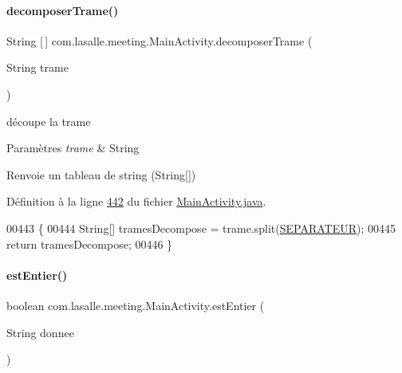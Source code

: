 \paragraph{\texorpdfstring{decomposer\+Trame()}{decomposerTrame()}}
{\footnotesize\ttfamily String \mbox{[}$\,$\mbox{]} com.\+lasalle.\+meeting.\+Main\+Activity.\+decomposer\+Trame (\begin{DoxyParamCaption}\item[{String}]{trame }\end{DoxyParamCaption})}



découpe la trame 


\begin{DoxyParams}{Paramètres}
{\em trame} & String \\
\hline
\end{DoxyParams}
\begin{DoxyReturn}{Renvoie}
un tableau de string (String\mbox{[}\mbox{]}) 
\end{DoxyReturn}


Définition à la ligne \hyperlink{_main_activity_8java_source_l00442}{442} du fichier \hyperlink{_main_activity_8java_source}{Main\+Activity.\+java}.


\begin{DoxyCode}
00443     \{
00444         String[] tramesDecompose = trame.split(\hyperlink{classcom_1_1lasalle_1_1meeting_1_1_main_activity_a44e95026afeb6899f23283db298f94c9}{SEPARATEUR});
00445         \textcolor{keywordflow}{return} tramesDecompose;
00446     \}
\end{DoxyCode}
\mbox{\label{classcom_1_1lasalle_1_1meeting_1_1_main_activity_a3841414e5b270c189de0d58bbd2aca57}} 
\paragraph{\texorpdfstring{est\+Entier()}{estEntier()}}
{\footnotesize\ttfamily boolean com.\+lasalle.\+meeting.\+Main\+Activity.\+est\+Entier (\begin{DoxyParamCaption}\item[{String}]{donnee }\end{DoxyParamCaption})\hspace{0.3cm}{\ttfamily [private]}}



